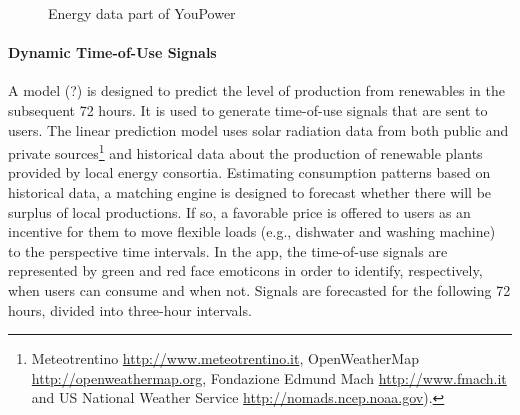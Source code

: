 \begin{figure*}[t!]
\centering
\caption{Energy data part of YouPower}
\label{fig:viz}
\end{figure*}

\paragraph{Dynamic Time-of-Use Signals}

A model (?) is designed to predict the level of production from renewables in the subsequent 72 hours. It is used to generate time-of-use signals that are sent to users. The linear prediction model uses solar radiation data from both public and private sources\footnote{Meteotrentino \url{http://www.meteotrentino.it}, OpenWeatherMap \url{http://openweathermap.org}, Fondazione Edmund Mach \url{http://www.fmach.it} and US National Weather Service \url{http://nomads.ncep.noaa.gov}).} and historical data about the production of renewable plants provided by local energy consortia.
Estimating consumption patterns based on historical data, a matching engine is designed to forecast whether there will be surplus of local productions. If so, a favorable price is offered to users as an incentive for them to move flexible loads (e.g., dishwater and washing machine) to the perspective time intervals. 
In the app, the time-of-use signals are represented by green and red face emoticons in order to identify, respectively, when users can consume and when not. Signals are forecasted
for the following 72 hours, divided into three-hour intervals.


